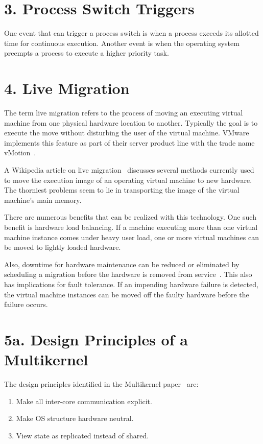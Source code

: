 \documentclass[12pt]{article}
\begin{document}
\section*{3. Process Switch Triggers}
One event that can trigger a process switch is when a process exceeds
its allotted time for continuous execution.  Another event is when the
operating system preempts a process to execute a higher priority task.

\section*{4. Live Migration}
The term live migration refers to the process of moving an executing
virtual machine from one physical hardware location to another.
Typically the goal is to execute the move without disturbing the user
of the virtual machine. VMware implements this feature as part of
their server product line with the trade name vMotion~\cite{vmware}.

A Wikipedia article on live migration~\cite{wikipedia-migration}
discusses several methods currently used to move the execution image
of an operating virtual machine to new hardware.  The thorniest
problems seem to lie in transporting the image of the virtual
machine's main memory.

There are numerous benefits that can be realized with this technology.
One such benefit is hardware load balancing.  If a machine executing
more than one virtual machine instance comes under heavy user load,
one or more virtual machines can be moved to lightly loaded hardware.

Also, downtime for hardware maintenance can be reduced or eliminated
by scheduling a migration before the hardware is removed from
service~\cite{vmware}.  This also has implications for fault
tolerance.  If an impending hardware failure is detected, the virtual
machine instances can be moved off the faulty hardware before the
failure occurs.

\section*{5a. Design Principles of a Multikernel}
The design principles identified in the Multikernel paper~\cite{barrelfish}
are:
\begin{enumerate}
  \item Make all inter-core communication explicit.
  \item Make OS structure hardware neutral.
  \item View state as replicated instead of shared.
\end{enumerate}
\end{document}
